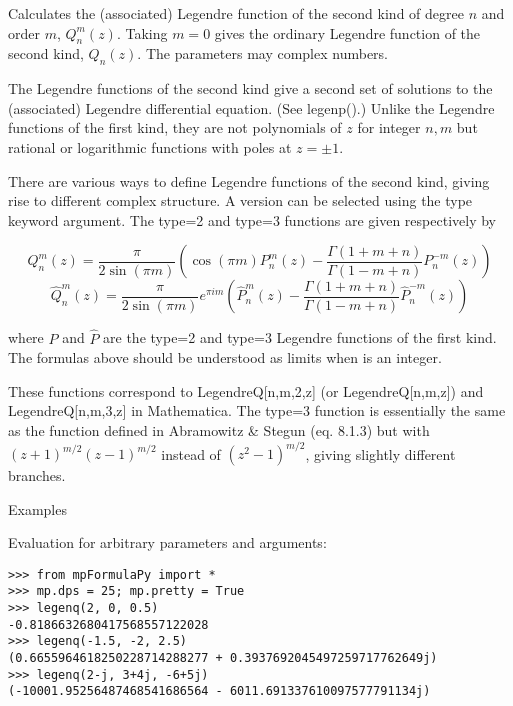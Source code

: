 \vpara
Calculates the (associated) Legendre function of the second kind of degree $n$ and order $m$, $Q_n^m(z)$. Taking $m=0$ gives the ordinary Legendre function of the second kind, $Q_n(z)$. The parameters may complex numbers.

\vpara
The Legendre functions of the second kind give a second set of solutions to the (associated) Legendre differential equation. (See legenp().) Unlike the Legendre functions of the first kind, they are not polynomials of $z$ for integer $n, m$ but rational or logarithmic functions with poles at $z=\pm1$.

\vpara
There are various ways to define Legendre functions of the second kind, giving rise to different complex structure. A version can be selected using the type keyword argument. The type=2 and type=3 functions are given respectively by

\begin{equation}
Q_n^m(z) = \frac{\pi}{2\sin(\pi m)} \left(\cos(\pi m)P_n^m(z) - \frac{\Gamma(1+m+n)}{\Gamma(1-m+n)}P_n^{-m}(z)  \right)
\end{equation}
\begin{equation}
\widehat{Q}_n^m(z) = \frac{\pi}{2\sin(\pi m)}e^{\pi i m} \left(\widehat{P}_n^m(z) - \frac{\Gamma(1+m+n)}{\Gamma(1-m+n)}\widehat{P}_n^{-m}(z)  \right)
\end{equation}

where $P$ and $\widehat{P}$ are the type=2 and type=3 Legendre functions of the first kind. The formulas above should be understood as limits when is an integer.

\vpara
These functions correspond to LegendreQ[n,m,2,z] (or LegendreQ[n,m,z]) and
LegendreQ[n,m,3,z] in Mathematica. The type=3 function is essentially the same as the function defined in Abramowitz \& Stegun (eq. 8.1.3) but with $(z+1)^{m/2} (z-1)^{m/2}$ instead of $(z^2-1)^{m/2}$, giving slightly different branches.

Examples

Evaluation for arbitrary parameters and arguments:

\begin{lstlisting}
>>> from mpFormulaPy import *
>>> mp.dps = 25; mp.pretty = True
>>> legenq(2, 0, 0.5)
-0.8186632680417568557122028
>>> legenq(-1.5, -2, 2.5)
(0.6655964618250228714288277 + 0.3937692045497259717762649j)
>>> legenq(2-j, 3+4j, -6+5j)
(-10001.95256487468541686564 - 6011.691337610097577791134j)
\end{lstlisting}




